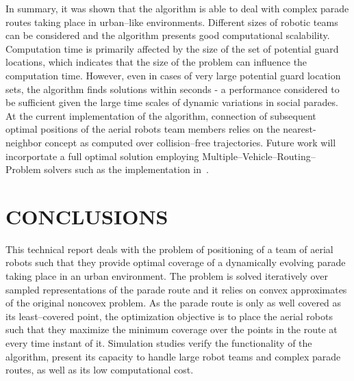 \documentclass[letterpaper, 10 pt, conference]{ieeeconf}  %
\begin{document}
In summary, it was shown that the algorithm is able to deal with complex parade routes taking place in urban--like environments. Different sizes of robotic teams can be considered and the algorithm presents good computational scalability. Computation time is primarily affected by the size of the set of potential guard locations, which indicates that the size of the problem can influence the computation time. However, even in cases of very large potential guard location sets, the algorithm finds solutions within seconds - a performance considered to be sufficient given the large time scales of dynamic variations in social parades. At the current implementation of the algorithm, connection of subsequent optimal positions of the aerial robots team members relies on the nearest-neighbor concept as computed over collision--free trajectories. Future work will incorportate a full optimal solution employing Multiple--Vehicle--Routing--Problem solvers such as the implementation in~\cite{OPENVRP}.

\section{CONCLUSIONS}\label{sec:concl}

This technical report deals with the problem of positioning of a team of aerial robots such that they provide optimal coverage of a dynamically evolving parade taking place in an urban environment. The problem is solved iteratively over sampled representations of the parade route and it relies on convex approximates of the original noncovex problem. As the parade route is only as well covered as its least--covered point, the optimization objective is to place the aerial robots such that they maximize the minimum coverage over the points in the route at every time instant of it. Simulation studies verify the functionality of the algorithm, present its capacity to handle large robot teams and complex parade routes, as well as its low computational cost. 

%
%

\end{document}
